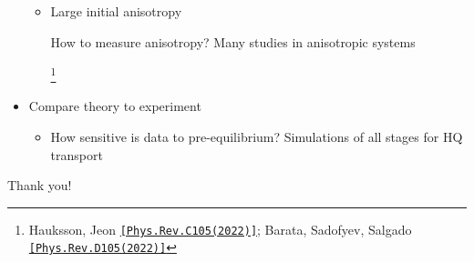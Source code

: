 \documentclass[aspectratio=169,11pt,usenames,dvipsnames]{beamer}
\renewcommand{\thefootnote}{$\star$}
\newcommand{\symfootnote}[1]{%
\let\oldthefootnote=\thefootnote%
\stepcounter{mpfootnote}%
\addtocounter{footnote}{-1}%
\renewcommand{\thefootnote}{$\dagger$}%
\footnote{#1}%
\let\thefootnote=\oldthefootnote%
}
\begin{document}
\begin{frame}
\begin{itemize}
\begin{itemize}
                    \item[\raisebox{0.2em}{\scalebox{0.6}{${\color{pinky}\blacktriangleright}$}}] Large initial anisotropy \\
                    {\scriptsize\color{lightgray}How to measure anisotropy? Many studies in anisotropic systems\symfootnote{\scriptsize Hauksson, Jeon \href{https://doi.org/10.1103/PhysRevC.105.014914}{{\color{customblue}\texttt{[Phys.Rev.C105(2022)]}}}; Barata, Sadofyev, Salgado \href{https://doi.org/10.1103/PhysRevD.105.114010}{{\color{customblue}\texttt{[Phys.Rev.D105(2022)]}}}}}
                \end{itemize}
                \item  {\large{Compare theory to experiment}}
                \begin{itemize}
                    \item[\raisebox{0.2em}{\scalebox{0.6}{${\color{jyured}\blacktriangleright}$}}] {\scriptsize\color{lightgray} How sensitive is data to pre-equilibrium? Simulations of all stages for HQ transport
                    }
                \end{itemize}
        \end{itemize} 
\end{frame}

\appendix

\begin{frame}{}
    \vspace{20pt}
    \huge\centering Thank you!
\end{frame}
\end{document}
